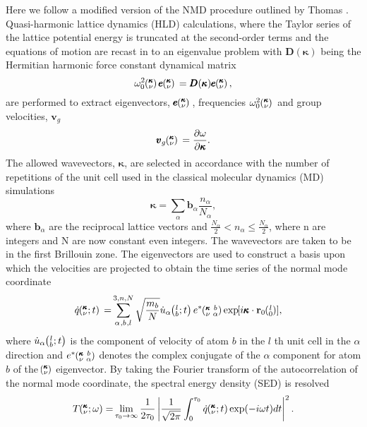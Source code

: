 Here we follow a modified version of the NMD procedure outlined by Thomas \cite {PhysRevB.81.081411}. Quasi-harmonic lattice dynamics (HLD) calculations, where the Taylor series of the lattice potential energy is truncated at the second-order terms and the equations of motion are recast in to an eigenvalue problem with $\pmb{D}(\pmb{\kappa})$ being the Hermitian harmonic force constant dynamical matrix \cite{dove_introduction_1993-3}
\begin{equation}\label{EQ:LD}
\omega^2_0 \kv {} \pmb{e} \kv {}=\pmb{D}(\pmb{\kappa}) \pmb{e} \kv{},
\end{equation}
are performed to extract eigenvectors, $\pmb{e} \mspace{-4.0mu}\left(\mspace{-8.0mu} \begin{smallmatrix}&\pmb{\kappa} \\&\nu\end{smallmatrix} \mspace{-3.0mu}\right){}$, frequencies $\omega^2_0 \mspace{-4.0mu}\left(\mspace{-8.0mu} \begin{smallmatrix}&\pmb{\kappa} \\&\nu\end{smallmatrix} \mspace{-3.0mu}\right) {}$ and group velocities, $\pmb{v}_{g}$
\begin{equation}\label{EQ:VG}
\pmb{v}_{g}\mspace{-4.0mu}\left(\mspace{-8.0mu} \begin{smallmatrix}&\pmb{\kappa} \\&\nu\end{smallmatrix} \mspace{-3.0mu}\right){}=\frac{\partial \omega}{\partial \pmb{\kappa}}.
\end{equation}
The allowed wavevectors, $\pmb{\kappa}$, are selected in accordance with the number of repetitions of the unit cell used in the classical molecular dynamics (MD) simulations 
\begin{equation}\label{EQ:NMD:allowdkpt}
\pmb{\kappa} = \sum_{\alpha} \pmb{b}_{\alpha} \frac{n_{\alpha}}{N_{\alpha}},
\end{equation}
where $\pmb{b}_\alpha$ are the reciprocal lattice vectors and $ \frac{N_\alpha}{2} < n_\alpha \le \frac {N_\alpha}{2}$, where n are integers and N are now constant even integers. The wavevectors are taken to be in the first Brillouin zone. The eigenvectors are used to construct a basis upon which the velocities are projected to obtain the time series of the normal mode coordinate 
\begin{equation}\label{EQ:NMD:qdot}
\begin{split}
\dot{q}\kvt{}{}{}=&\SUM{0}{}\sqrt{\frac{m_b}{N}}\dot{u}_{\alpha}\lbt e^*\kvba\EXP{i\pmb{\kappa}\cdot\mathbf{r}_0\ab{l}{0}},
\end{split}
\end{equation}
where $\dot{u}_{\alpha}\mspace{-4.0mu}\left(\mspace{-8.0mu} \begin{smallmatrix}&l \\&b\end{smallmatrix}\mspace{-2.0mu};t\right)$ is the component of velocity of atom $b$ in the $l$ th unit cell in the $\alpha$ direction and $e^*\mspace{-4.0mu}\left(\mspace{-8.0mu} \begin{smallmatrix} &\pmb{\kappa} &b \\ &\nu &\alpha\end{smallmatrix} \mspace{-3.0mu}\right)$ denotes the complex conjugate of the $\alpha$ component for atom $b$ of the $\mspace{-4.0mu}\left(\mspace{-8.0mu} \begin{smallmatrix}&\pmb{\kappa} \\&\nu\end{smallmatrix} \mspace{-3.0mu}\right)$ eigenvector. By taking the Fourier transform of the autocorrelation of the normal mode coordinate, the spectral energy density (SED) is resolved \cite{dove_introduction_1993-3}
\begin{equation}\label{EQ:NMD:SED}
\begin{split}
T\mspace{-4.0mu}\left(\mspace{-8.0mu} \begin{smallmatrix}&\pmb{\kappa} \\&\nu\end{smallmatrix} \mspace{-2.0mu};\omega\right)=&\lim_{\tau_0\rightarrow\infty}\frac{1}{2\tau_0}\left|\frac{1}{\sqrt{2\pi}}\int_{0}^{\tau_0}\dot{q}\mspace{-4.0mu}\left(\mspace{-8.0mu} \begin{smallmatrix}&\pmb{\kappa} \\&\nu\end{smallmatrix} \mspace{-2.0mu};t\right)\exp(-i\omega t)dt\right|^2.\\
\end{split}
\end{equation}
